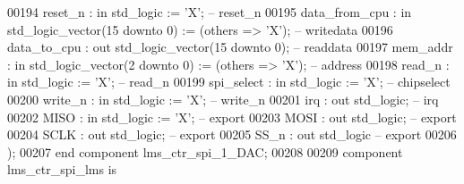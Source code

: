 \begin{DoxyCode}
00194             reset\_n       : \textcolor{keywordflow}{in}  \textcolor{comment}{std\_logic}                     := 'X';             \textcolor{keyword}{-- reset\_n}
00195             data\_from\_cpu : \textcolor{keywordflow}{in}  \textcolor{comment}{std\_logic\_vector}(\textcolor{vhdllogic}{}\textcolor{vhdllogic}{15} \textcolor{keywordflow}{downto} \textcolor{vhdllogic}{}\textcolor{vhdllogic}{0}) := (\textcolor{keywordflow}{others} => 'X'); \textcolor{keyword}{-- writedata}
00196             data\_to\_cpu   : \textcolor{keywordflow}{out} \textcolor{comment}{std\_logic\_vector}(\textcolor{vhdllogic}{}\textcolor{vhdllogic}{15} \textcolor{keywordflow}{downto} \textcolor{vhdllogic}{}\textcolor{vhdllogic}{0});                    \textcolor{keyword}{-- readdata}
00197             mem\_addr      : \textcolor{keywordflow}{in}  \textcolor{comment}{std\_logic\_vector}(\textcolor{vhdllogic}{}\textcolor{vhdllogic}{2} \textcolor{keywordflow}{downto} \textcolor{vhdllogic}{}\textcolor{vhdllogic}{0})  := (\textcolor{keywordflow}{others} => 'X'); \textcolor{keyword}{-- address}
00198             read\_n        : \textcolor{keywordflow}{in}  \textcolor{comment}{std\_logic}                     := 'X';             \textcolor{keyword}{-- read\_n}
00199             spi\_select    : \textcolor{keywordflow}{in}  \textcolor{comment}{std\_logic}                     := 'X';             \textcolor{keyword}{-- chipselect}
00200             write\_n       : \textcolor{keywordflow}{in}  \textcolor{comment}{std\_logic}                     := 'X';             \textcolor{keyword}{-- write\_n}
00201             irq           : \textcolor{keywordflow}{out} \textcolor{comment}{std\_logic};                                        \textcolor{keyword}{-- irq}
00202             MISO          : \textcolor{keywordflow}{in}  \textcolor{comment}{std\_logic}                     := 'X';             \textcolor{keyword}{-- export}
00203             MOSI          : \textcolor{keywordflow}{out} \textcolor{comment}{std\_logic};                                        \textcolor{keyword}{-- export}
00204             SCLK          : \textcolor{keywordflow}{out} \textcolor{comment}{std\_logic};                                        \textcolor{keyword}{-- export}
00205             SS\_n          : \textcolor{keywordflow}{out} \textcolor{comment}{std\_logic}\textcolor{keyword}{                                         -- export}
00206         );
00207     \textcolor{keywordflow}{end} \textcolor{keywordflow}{component} \textcolor{vhdlchar}{lms_ctr_spi_1_DAC};
00208 
00209     \textcolor{keywordflow}{component} lms\_ctr\_spi\_lms \textcolor{keywordflow}{is}

\end{DoxyCode}
